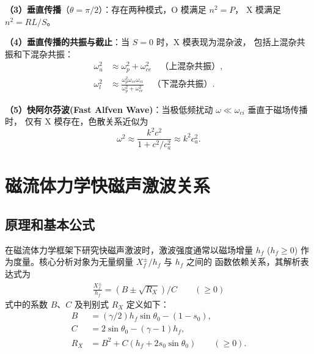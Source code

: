 \documentclass{article}
\begin{document}
\textbf{（3）垂直传播}（$\theta = \pi/2$）：存在两种模式，O 模满足 $n^2 = P$，
X 模满足 $n^2 = RL/S$。

\textbf{（4）垂直传播的共振与截止}：当 $S = 0$ 时，X 模表现为混杂波，
包括上混杂共振和下混杂共振：
\begin{align}
\omega_u^2 &\approx \omega_p^2 + \omega_{ce}^2 \quad \text{（上混杂共振）}, \\
\omega_l^2 &\approx \frac{\omega_p^2 \omega_{ce} \omega_{ci}}{\omega_p^2 + \omega_{ce}^2} \quad \text{（下混杂共振）}.
\end{align}

\textbf{（5）快阿尔芬波(Fast Alfven Wave)}：当极低频扰动 $\omega \ll \omega_{ci}$ 垂直于磁场传播时，
仅有 X 模存在，色散关系近似为
\begin{equation}
\omega^2 \approx \frac{k^2 c^2}{1 + c^2/c_a^2} \approx k^2 c_a^2.
\end{equation}


\section{磁流体力学快磁声激波关系}
\subsection{原理和基本公式}

在磁流体力学框架下研究快磁声激波时，激波强度通常以磁场增量 $h_f$ ($h_f \ge 0$)
作为度量\citep{Jeffrey1964}。核心分析对象为无量纲量 $X_f^\pm/h_f$ 与 $h_f$ 之间的
函数依赖关系，其解析表达式为
\begin{align}
\frac{X_f^\pm}{h_f} = (B \pm \sqrt{R_X})/C \qquad (\ge 0) \label{Eqn:fShock}
\end{align}
式中的系数 $B$、$C$ 及判别式 $R_X$ 定义如下：
\begin{align}
B &= (\gamma/2) h_f \sin\theta_0 - (1-s_0),
\\
C &= 2 \sin\theta_0 - (\gamma-1) h_f,
\\
R_X &= B^2 + C(h_f + 2 s_0 \sin\theta_0) \qquad (\ge 0).
\end{align}
\end{document}
